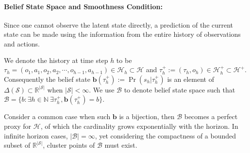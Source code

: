 \documentclass[twoside]{article}
\newtheorem{assumption}{Assumption}
\newcommand{\R}{\mathbb{R}}
\newcommand{\CAL}[1]{\mathcal{#1}}
\newcommand{\zyh}[1]{{\color{blue}{ [\textbf{Youheng:}} #1]}}
\newcommand{\yplu}[1]{{\color{orange}{ [\textbf{Yiping:}} #1]}}
\begin{document}
\paragraph{Belief State Space and Smoothness Condition:}
Since one cannot observe the latent state directly, a prediction of the current state can be made using the information from the entire history of observations and actions. 

We denote the history at time step $h$ to be
$\tau_h=(o_1,a_1,o_2,a_2,\cdots,o_{h-1},a_{h-1})\in\mathcal{H}_h\subset \CAL{H}$ and $\tau_h^+:=(\tau_h,o_h)\in\CAL{H}_h^+\subset\CAL{H}^+$.
Consequently the belief state $\mathbf{b}(\tau_h^+):=\Pr(s_h|\tau_h^+)$ is an element of $\Delta(\mathcal{S})\subset\mathbb{R}^{|\mathcal{S}|}$ when $|\mathcal{S}|<\infty$. We use $\mathcal{B}$ to denote belief state space such that $\mathcal{B}=\{b:\exists h\in \mathbb{N}\ \exists \tau_h^+, \mathbf{b}(\tau_h^+)=b\}$. %

Consider a common case when such $\mathbf{b}$ is a bijection, then $\CAL{B}$ becomes a perfect proxy for $\CAL{H}$, of which the cardinality grows exponentially with the horizon. In infinite horizon cases, $|\CAL{B}|=\infty$, yet considering the compactness of a bounded subset of $\R^{|\CAL{S}|}$, cluster points of $\CAL{B}$ must exist.
\end{document}
